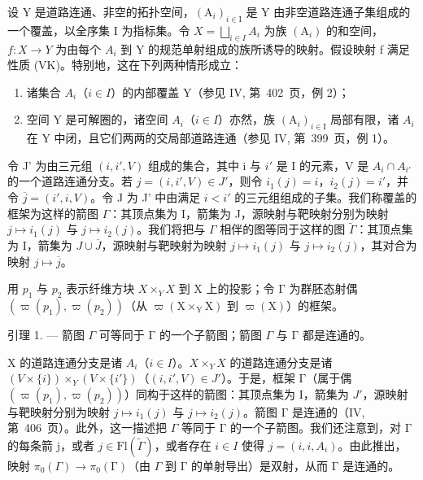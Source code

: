 设 Y 是道路连通、非空的拓扑空间，\((\mathrm{A}_{i})_{i\in\mathrm{I}}\) 是 Y 由非空道路连通子集组成的一个覆盖，以全序集 I 为指标集。令 \(X=\bigsqcup_{i\in I}A_{i}\) 为族 \((\mathrm{A}_{i})\) 的和空间，\(f:X\to Y\) 为由每个 \(A_{i}\) 到 Y 的规范单射组成的族所诱导的映射。假设映射 f 满足性质 (VK)。特别地，这在下列两种情形成立：

\begin{enumerate}
\def\labelenumi{(\roman{enumi})}
\item
  诸集合 \(A_{i}\)（\(i \in I\)）的内部覆盖 Y（参见 IV, 第~402~页，例 2）；
\item
  空间 Y 是可解圈的，诸空间 \(A_{i}\)（\(i \in I\)）亦然，族 \((\mathrm{A}_{i})_{i \in \mathrm{I}}\) 局部有限，诸 \(A_{i}\) 在 Y 中闭，且它们两两的交局部道路连通（参见 IV, 第~399~页，例 1）。
\end{enumerate}

令 J' 为由三元组 \((i, i', V)\) 组成的集合，其中 i 与 \(i'\) 是 I 的元素，V 是 \(A_i \cap A_{i'}\) 的一个道路连通分支。若 \(j = (i, i', V) \in J'\)，则令 \(i_1(j) = i\)，\(i_2(j) = i'\)，并令 \(\overline{j} = (i', i, V)\)。令 J 为 J' 中由满足 \(i < i'\) 的三元组组成的子集。我们称覆盖的框架为这样的箭图 \(\Gamma\)：其顶点集为 I，箭集为 J，源映射与靶映射分别为映射 \(j \mapsto i_1(j)\) 与 \(j \mapsto i_2(j)\)。我们将把与 \(\Gamma\) 相伴的图等同于这样的图 \(\widetilde{\Gamma}\)：其顶点集为 I，箭集为 \(J \cup \overline{J}\)，源映射与靶映射为映射 \(j \mapsto i_{1}(j)\) 与 \(j \mapsto i_{2}(j)\)，其对合为映射 \(j \mapsto \overline{j}\)。

用 \(p_1\) 与 \(p_2\) 表示纤维方块 \(X \times_{Y} X\) 到 X 上的投影；令 \(\textsf{Γ}\) 为群胚态射偶 \((\varpi(p_1), \varpi(p_2))\)（从 \(\varpi(\mathrm{X} \times_{\mathrm{Y}} \mathrm{X})\) 到 \(\varpi(\mathrm{X})\)）的框架。

引理 1. --- 箭图 \(\Gamma\) 可等同于 \(\textsf{Γ}\) 的一个子箭图；箭图 \(\Gamma\) 与 \(\textsf{Γ}\) 都是连通的。

X 的道路连通分支是诸 \(A_{i}\)（\(i \in I\)）。\(X \times_{Y} X\) 的道路连通分支是诸 \((V \times \{i\}) \times_{Y} (V \times \{i'\})\)（\((i, i', V) \in J'\)）。于是，框架 \(\textsf{Γ}\)（属于偶 \((\varpi(p_1), \varpi(p_2))\)）同构于这样的箭图：其顶点集为 I，箭集为 \(J'\)，源映射与靶映射分别为映射 \(j \mapsto i_1(j)\) 与 \(j \mapsto i_2(j)\)。箭图 \(\textsf{Γ}\) 是连通的（IV, 第~406~页）。此外，这一描述把 \(\Gamma\) 等同于 \(\textsf{Γ}\) 的一个子箭图。我们还注意到，对 \(\textsf{Γ}\) 的每条箭 j，或者 \(j \in \mathrm{Fl}(\widetilde{\Gamma})\)，或者存在 \(i \in I\) 使得 \(j = (i, i, A_i)\)。由此推出，映射 \(\pi_0(\Gamma) \to \pi_0(\textsf{Γ})\)（由 \(\Gamma\) 到 \(\textsf{Γ}\) 的单射导出）是双射，从而 \(\textsf{Γ}\) 是连通的。

